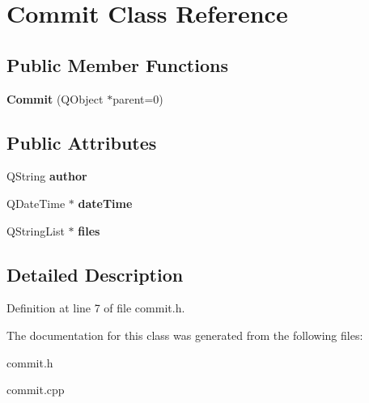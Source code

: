 \hypertarget{class_commit}{
\section{Commit Class Reference}
\label{class_commit}
}
\subsection*{Public Member Functions}
\begin{DoxyCompactItemize}
\item 
\hypertarget{class_commit_a87d65967d2ccaa7a2254f56cb2bdf866}{
{\bfseries Commit} (QObject $\ast$parent=0)}
\label{class_commit_a87d65967d2ccaa7a2254f56cb2bdf866}

\end{DoxyCompactItemize}
\subsection*{Public Attributes}
\begin{DoxyCompactItemize}
\item 
\hypertarget{class_commit_ae0ebcf73f2a4d9b1e5ef0a86cc658f3f}{
QString {\bfseries author}}
\label{class_commit_ae0ebcf73f2a4d9b1e5ef0a86cc658f3f}

\item 
\hypertarget{class_commit_ad27ecb1a3f71bcbf60a9865548092056}{
QDateTime $\ast$ {\bfseries dateTime}}
\label{class_commit_ad27ecb1a3f71bcbf60a9865548092056}

\item 
\hypertarget{class_commit_a30a64b8cc596fd1b8cbeeaccf1107b50}{
QStringList $\ast$ {\bfseries files}}
\label{class_commit_a30a64b8cc596fd1b8cbeeaccf1107b50}

\end{DoxyCompactItemize}


\subsection{Detailed Description}


Definition at line 7 of file commit.h.



The documentation for this class was generated from the following files:\begin{DoxyCompactItemize}
\item 
commit.h\item 
commit.cpp\end{DoxyCompactItemize}
